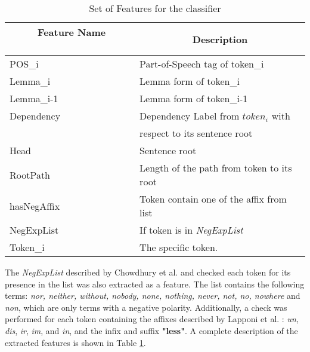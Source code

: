 \begin{table}
\centering
\caption{\label{tab:features} Set of Features for the classifier}
\begin{tabular}{ll}
\hline
\multicolumn{1}{c}{\textbf{~ ~ ~ Feature Name~ ~ ~ ~}} & \multicolumn{1}{c}{\textbf{Description}}                                                                                              \\ 
\hline
POS_i                                                 & Part-of-Speech tag of token_i\\
Lemma_i                                               & Lemma form of token_i\\
Lemma_{i-1}                                           & Lemma form of token_{i-1}\\
Dependency                                            & Dependency Label from $token_{i}$ with\\& respect to its sentence root \\
Head                                                  & Sentence root\\
RootPath                                              & Length of the path from token to its root\\
hasNegAffix                                           & Token contain one of the affix from list \\
NegExpList                                            & If token is in \textit{NegExpList} \\

Token_{i} & The specific token. \\
\hline
\end{tabular}
\end{table}


The \textit{NegExpList} described by Chowdhury et al. \cite{chowdhury2012fbk} and checked each token for its presence in the list was also extracted as a feature. The list contains the following terms: \textit{nor, neither, without, nobody, none, nothing, never, not, no, nowhere} and  \textit{non}, which are only terms with a negative polarity. Additionally, a check was performed for each token containing the affixes described by Lapponi et al. \cite{lapponi2012uio}: \textit{un}, \textit{dis}, \textit{ir}, \textit{im}, and \textit{in}, and the infix and suffix \textbf{"less"}. A complete description of the extracted features is shown in Table \ref{tab:features}.

